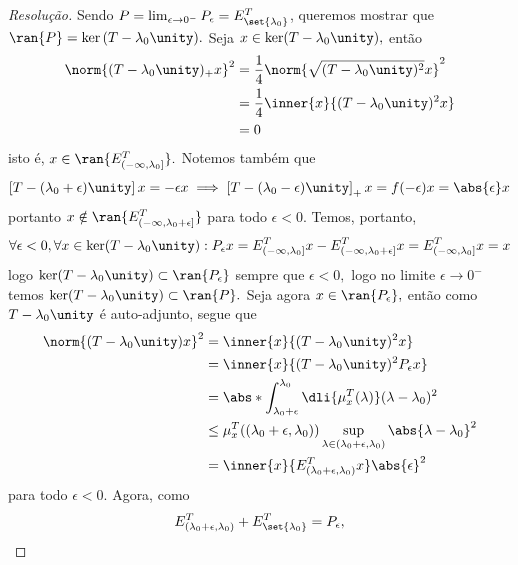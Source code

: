 \begin{proof}[Resolução]
  Sendo \(P = \lim_{\epsilon\to0^{-}}{P_\epsilon} = E^{T}_{\set{\lambda_0}}\), queremos mostrar que \(\ran{P} = \ker{(T - \lambda_0\unity)}.\) Seja \(x \in \ker(T - \lambda_0\unity),\) então
  \begin{align*}
    \norm{(T - \lambda_0\unity)_+x}^2 &= \frac14\norm{\sqrt{(T - \lambda_0\unity)^2}x}^2\\
                                      &= \frac14\inner{x}{(T - \lambda_0\unity)^2x}\\
                                      &= 0
  \end{align*}
  isto é, \(x \in \ran{E^T_{(-\infty,\lambda_0]}}.\) Notemos também que
  \begin{equation*}
    \left[T - (\lambda_0 + \epsilon)\unity\right]x = -\epsilon x \implies \left[T - (\lambda_0 - \epsilon)\unity\right]_+x = f(-\epsilon)x = \abs{\epsilon} x
  \end{equation*}
  portanto \(x \notin \ran{E^T_{(-\infty, \lambda_0 + \epsilon]}}\) para todo \(\epsilon < 0.\) Temos, portanto,
  \begin{equation*}
    \forall \epsilon < 0 , \forall x \in \ker(T - \lambda_0 \unity) : P_\epsilon x = E^T_{(-\infty, \lambda_0]}x - E^T_{(-\infty, \lambda_0 + \epsilon]}x = E^T_{(-\infty, \lambda_0]}x = x
  \end{equation*}
  logo \(\ker(T - \lambda_0\unity) \subset \ran{P_\epsilon}\) sempre que \(\epsilon < 0,\) logo no limite \(\epsilon \to 0^{-}\) temos \(\ker(T - \lambda_0\unity) \subset \ran{P}.\) Seja agora \(x \in \ran{P_\epsilon},\) então como \(T - \lambda_0\unity\) é auto-adjunto, segue que
  \begin{align*}
    \norm{(T - \lambda_0\unity)x}^2 &= \inner{x}{(T - \lambda_0\unity)^2x}\\
                                  &= \inner{x}{(T - \lambda_0\unity)^2P_\epsilon x}\\
                                  &= \abs*{\int_{\lambda_0 + \epsilon}^{\lambda_0} \dli{\mu_x^T(\lambda)} (\lambda - \lambda_0)^2}\\
                                  &\leq \mu_x^T((\lambda_0 + \epsilon, \lambda_0)) \sup_{\lambda \in (\lambda_0 + \epsilon, \lambda_0)}{\abs{\lambda - \lambda_0}^2}\\
                                  &= \inner{x}{E^T_{(\lambda_0 + \epsilon, \lambda_0)}x} \abs{\epsilon}^2
  \end{align*}
  para todo \(\epsilon < 0.\) Agora, como
  \begin{equation*}
    E^T_{(\lambda_0 + \epsilon, \lambda_0)} + E^T_{\set{\lambda_0}} = P_\epsilon,

\end{equation*}
\end{proof}
